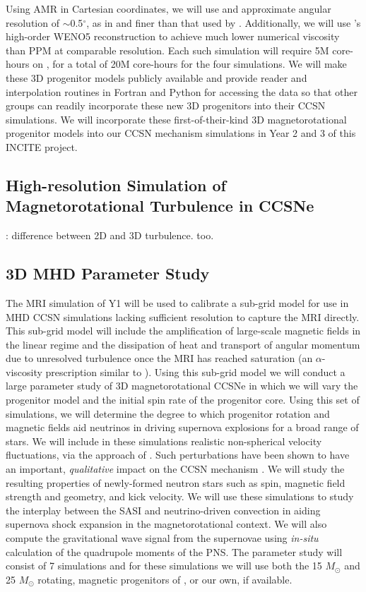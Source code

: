 Using AMR in Cartesian coordinates, we will use and approximate angular resolution of $\sim$0.5$^\circ$, as in \citep{Couch:2015a} and finer than that used by \citep{Muller:2017}.
Additionally, we will use \spark's high-order WENO5 reconstruction to achieve much lower numerical viscosity than PPM at comparable resolution.
Each such simulation will require 5M core-hours on \mira, for a total of 20M core-hours for the four simulations.
We will make these 3D progenitor models publicly available and provide reader and interpolation routines in Fortran and Python for accessing the data so that other groups can readily incorporate these new 3D progenitors into their CCSN simulations.
We will incorporate these first-of-their-kind 3D magnetorotational progenitor models into our CCSN mechanism simulations in Year 2 and 3 of this INCITE project.

\subsection{High-resolution Simulation of Magnetorotational Turbulence in CCSNe}


\citet{Melson:2015a}: difference between 2D and 3D turbulence. \citet{Muller:2017} too.


\subsection{3D MHD Parameter Study}
\label{sec:ParamStudy}

The MRI simulation of Y1 will be used to calibrate a sub-grid model for use in MHD CCSN simulations lacking sufficient resolution to capture the MRI directly.
This sub-grid model will include the amplification of large-scale magnetic fields in the linear regime and the dissipation of heat and transport of angular momentum due to unresolved turbulence once the MRI has reached saturation (an $\alpha$-viscosity prescription similar to \citet{Thompson:2005iw}).
Using this sub-grid model we will conduct a large parameter study of 3D magnetorotational CCSNe in which we will vary the progenitor model and the initial spin rate of the progenitor core.
Using this set of simulations, we will determine the degree to which progenitor rotation and magnetic fields aid neutrinos in driving supernova explosions for a broad range of stars.
We will include in these simulations realistic non-spherical velocity fluctuations, via the approach of \citet{Chatzopoulos:2014uj}.
Such perturbations have been shown to have an important, {\it qualitative} impact on the CCSN mechanism \citep{Couch:2013bl}.
We will study the resulting properties of newly-formed neutron stars such as spin, magnetic field strength and geometry, and kick velocity.
We will use these simulations to study the interplay between the SASI and neutrino-driven convection in aiding supernova shock expansion in the magnetorotational context.
We will also compute the gravitational wave signal from the supernovae using {\it in-situ} calculation of the quadrupole moments of the PNS.
The parameter study will consist of 7 simulations and for these simulations we will use both the 15 $M_\odot$ and 25 $M_\odot$ rotating, magnetic progenitors of \citet{Heger:2005bi}, or our own, if available.

